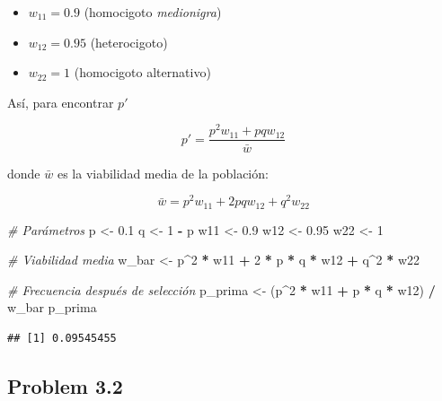 \documentclass[
  11pt,
]{article}
\newenvironment{Shaded}{\begin{snugshade}}{\end{snugshade}}
\newcommand{\CommentTok}[1]{\textcolor[rgb]{0.56,0.35,0.01}{\textit{#1}}}
\newcommand{\DecValTok}[1]{\textcolor[rgb]{0.00,0.00,0.81}{#1}}
\newcommand{\FloatTok}[1]{\textcolor[rgb]{0.00,0.00,0.81}{#1}}
\newcommand{\NormalTok}[1]{#1}
\newcommand{\OtherTok}[1]{\textcolor[rgb]{0.56,0.35,0.01}{#1}}
\newcommand{\SpecialCharTok}[1]{\textcolor[rgb]{0.81,0.36,0.00}{\textbf{#1}}}
\begin{document}
\begin{itemize}
\item
  \(w_{11} = 0.9\) (homocigoto \emph{medionigra})
\item
  \(w_{12} = 0.95\) (heterocigoto)
\item
  \(w_{22} = 1\) (homocigoto alternativo)
\end{itemize}

Así, para encontrar \(p'\)

\[
p' = \frac{p^2 w_{11} + pq w_{12}}{\bar{w}}
\]

donde \(\bar{w}\) es la viabilidad media de la población:

\[
\bar{w} = p^2 w_{11} + 2pq w_{12} + q^2 w_{22}
\]

\begin{Shaded}
\begin{Highlighting}[]
\CommentTok{\# Parámetros}
\NormalTok{p }\OtherTok{\textless{}{-}} \FloatTok{0.1}
\NormalTok{q }\OtherTok{\textless{}{-}} \DecValTok{1} \SpecialCharTok{{-}}\NormalTok{ p}
\NormalTok{w11 }\OtherTok{\textless{}{-}} \FloatTok{0.9}
\NormalTok{w12 }\OtherTok{\textless{}{-}} \FloatTok{0.95}
\NormalTok{w22 }\OtherTok{\textless{}{-}} \DecValTok{1}

\CommentTok{\# Viabilidad media}
\NormalTok{w\_bar }\OtherTok{\textless{}{-}}\NormalTok{ p}\SpecialCharTok{\^{}}\DecValTok{2} \SpecialCharTok{*}\NormalTok{ w11 }\SpecialCharTok{+} \DecValTok{2} \SpecialCharTok{*}\NormalTok{ p }\SpecialCharTok{*}\NormalTok{ q }\SpecialCharTok{*}\NormalTok{ w12 }\SpecialCharTok{+}\NormalTok{ q}\SpecialCharTok{\^{}}\DecValTok{2} \SpecialCharTok{*}\NormalTok{ w22}

\CommentTok{\# Frecuencia después de selección}
\NormalTok{p\_prima }\OtherTok{\textless{}{-}}\NormalTok{ (p}\SpecialCharTok{\^{}}\DecValTok{2} \SpecialCharTok{*}\NormalTok{ w11 }\SpecialCharTok{+}\NormalTok{ p }\SpecialCharTok{*}\NormalTok{ q }\SpecialCharTok{*}\NormalTok{ w12) }\SpecialCharTok{/}\NormalTok{ w\_bar}
\NormalTok{p\_prima}
\end{Highlighting}
\end{Shaded}

\begin{verbatim}
## [1] 0.09545455
\end{verbatim}

\subsection{Problem 3.2}\label{problem-3.2}
\end{document}
